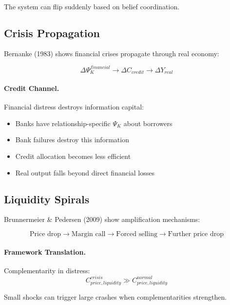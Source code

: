 The system can flip suddenly based on belief coordination.

\subsection{Crisis Propagation}

Bernanke (1983) shows financial crises propagate through real economy:

\begin{equation}
\boxed{
\Delta \Psi_K^{financial} \to \Delta C_{credit} \to \Delta Y_{real}
}
\label{eq:bernanke}
\end{equation}

\paragraph{Credit Channel.}
Financial distress destroys information capital:
\begin{itemize}
    \item Banks have relationship-specific $\Psi_K$ about borrowers
    \item Bank failures destroy this information
    \item Credit allocation becomes less efficient
    \item Real output falls beyond direct financial losses
\end{itemize}

\subsection{Liquidity Spirals}

Brunnermeier \& Pedersen (2009) show amplification mechanisms:

\begin{equation}
\text{Price drop} \to \text{Margin call} \to \text{Forced selling} \to \text{Further price drop}
\end{equation}

\paragraph{Framework Translation.}
Complementarity in distress:
\begin{equation}
C_{price, liquidity}^{crisis} \gg C_{price, liquidity}^{normal}
\end{equation}

Small shocks can trigger large crashes when complementarities strengthen.


